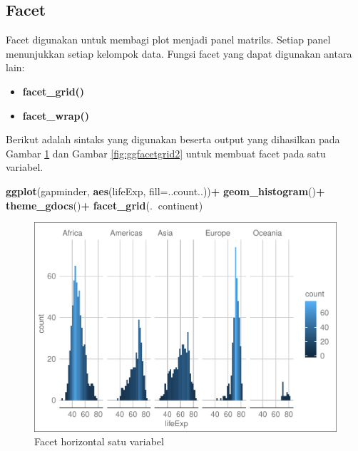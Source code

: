 \documentclass[]{book}
\newenvironment{Shaded}{\begin{snugshade}}{\end{snugshade}}
\newcommand{\KeywordTok}[1]{\textcolor[rgb]{0.13,0.29,0.53}{\textbf{#1}}}
\newcommand{\DataTypeTok}[1]{\textcolor[rgb]{0.13,0.29,0.53}{#1}}
\newcommand{\StringTok}[1]{\textcolor[rgb]{0.31,0.60,0.02}{#1}}
\newcommand{\OperatorTok}[1]{\textcolor[rgb]{0.81,0.36,0.00}{\textbf{#1}}}
\newcommand{\NormalTok}[1]{#1}
\providecommand{\tightlist}{%
  \setlength{\itemsep}{0pt}\setlength{\parskip}{0pt}}
\begin{document}
\subsection{Facet}\label{facet}

Facet digunakan untuk membagi plot menjadi panel matriks. Setiap panel
menunjukkan setiap kelompok data. Fungsi facet yang dapat digunakan
antara lain:

\begin{itemize}
\tightlist
\item
  \textbf{facet\_grid()}
\item
  \textbf{facet\_wrap()}
\end{itemize}

Berikut adalah sintaks yang digunakan beserta output yang dihasilkan
pada Gambar \ref{fig:ggfacetgrid} dan Gambar \ref{fig:ggfacetgrid2}
untuk membuat facet pada satu variabel.

\begin{Shaded}
\begin{Highlighting}[]
\KeywordTok{ggplot}\NormalTok{(gapminder, }\KeywordTok{aes}\NormalTok{(lifeExp, }\DataTypeTok{fill=}\NormalTok{..count..))}\OperatorTok{+}
\StringTok{  }\KeywordTok{geom_histogram}\NormalTok{()}\OperatorTok{+}
\StringTok{  }\KeywordTok{theme_gdocs}\NormalTok{()}\OperatorTok{+}
\StringTok{  }\KeywordTok{facet_grid}\NormalTok{(.}\OperatorTok{~}\NormalTok{continent)}
\end{Highlighting}
\end{Shaded}

\begin{figure}

{\centering \includegraphics[width=0.9\linewidth]{EnvStat_files/figure-latex/ggfacetgrid-1} 

}

\caption{Facet horizontal satu variabel}\label{fig:ggfacetgrid}
\end{figure}
\end{document}

